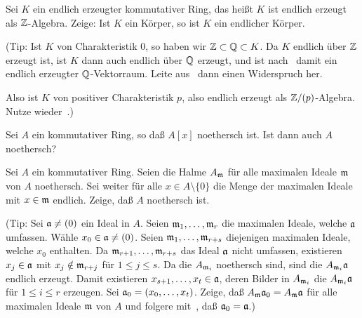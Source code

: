 \begin{exercise}
	Sei \(K\) ein endlich erzeugter kommutativer Ring, das heißt \(K\) ist
	endlich erzeugt als \(\mathbb Z\)-Algebra. Zeige: Ist \(K\) ein Körper, so
	ist \(K\) ein endlicher Körper.
	
	(Tip: Ist \(K\) von Charakteristik \(0\), so haben wir \(\mathbb Z \subset
	\mathbb Q \subset K\). Da \(K\) endlich über \(\mathbb Z\) erzeugt ist, ist
	\(K\) dann auch endlich über \(\mathbb Q\) erzeugt, und ist
	nach~ damit ein endlich erzeugter
	\(\mathbb Q\)-Vektorraum. Leite aus~ dann
	einen Widerspruch her.
	
	Also ist \(K\) von positiver Charakteristik \(p\), also endlich erzeugt
	als \(\mathbb Z/(p)\)-Algebra. Nutze wieder~.)
\end{exercise}

\begin{exercise}
	Sei \(A\) ein kommutativer Ring, so daß \(A[x]\) noethersch ist. Ist
	dann auch \(A\) noethersch?
\end{exercise}

\begin{exercise}
	\label{exer:stalks_are_noetherian}
	Sei \(A\) ein kommutativer Ring. Seien die Halme \(A_{\mathfrak{m}}\) für
	alle maximalen Ideale \(\mathfrak{m}\) von \(A\) noethersch. Sei weiter für
	alle \(x \in A \setminus \{0\}\) die Menge der maximalen Ideale mit
	\(x \in \mathfrak{m}\) endlich. Zeige, daß \(A\) noethersch ist.
	
	(Tip: Sei \(\mathfrak{a} \neq (0)\) ein Ideal in \(A\). Seien \(\mathfrak{m}_1,
	\dotsc, \mathfrak{m}_r\) die maximalen Ideale, welche \(\mathfrak{a}\) umfassen.
	Wähle \(x_0 \in \mathfrak{a} \neq (0)\). Seien \(\mathfrak{m}_1, \dotsc,
	\mathfrak{m}_{r + s}\) diejenigen maximalen Ideale, welche \(x_0\) enthalten.
	Da \(\mathfrak{m}_{r + 1}, \dotsc, \mathfrak{m}_{r + s}\) das Ideal \(\mathfrak{a}\)
	nicht umfassen, existieren \(x_j \in \mathfrak{a}\) mit \(x_j \notin
	\mathfrak{m}_{r + j}\) für \(1 \leq j \leq s\). Da die \(A_{\mathfrak{m}_i}\)
	noethersch sind, sind die \(A_{\mathfrak{m}_i} \mathfrak{a}\) endlich erzeugt.
	Damit existieren \(x_{s + 1}, \dotsc, x_t \in \mathfrak{a}\), deren Bilder
	in \(A_{\mathfrak{m}_i}\) die \(A_{\mathfrak{m}_i} \mathfrak{a}\) für
	\(1 \leq i \leq r\) erzeugen. Sei \(\mathfrak{a}_0 = (x_0, \dotsc, x_t)\).
	Zeige, daß \(A_{\mathfrak{m}} \mathfrak{a}_0 = A_{\mathfrak{m}} \mathfrak{a}\) für alle
	maximalen Ideale \(\mathfrak{m}\) von \(A\) und folgere
	mit~, daß \(\mathfrak{a}_0 = \mathfrak{a}\).)
\end{exercise}

